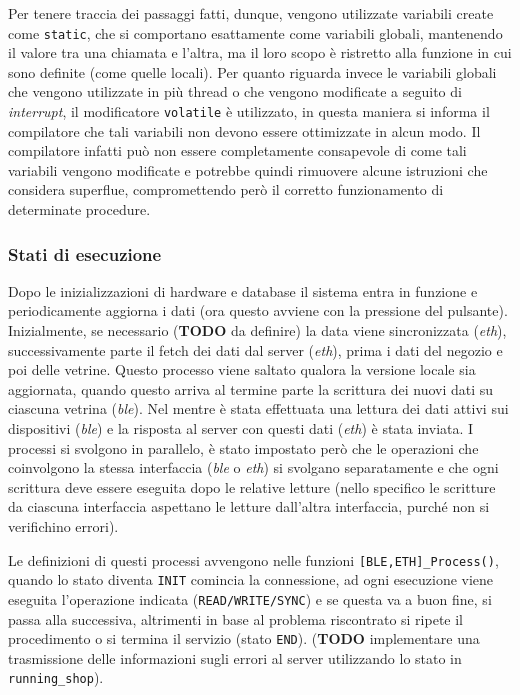 Per tenere traccia dei passaggi fatti, dunque, vengono utilizzate variabili create come \texttt{static}, che si comportano esattamente come variabili globali, mantenendo il valore tra una chiamata e l'altra, ma il loro scopo \`e ristretto alla funzione in cui sono definite (come quelle locali). Per quanto riguarda invece le variabili globali che vengono utilizzate in pi\`u thread o che vengono modificate a seguito di \textit{interrupt}, il modificatore \texttt{volatile} \`e utilizzato, in questa maniera si informa il compilatore che tali variabili non devono essere ottimizzate in alcun modo. Il compilatore infatti pu\`o non essere completamente consapevole di come tali variabili vengono modificate e potrebbe quindi rimuovere alcune istruzioni che considera superflue, compromettendo per\`o il corretto funzionamento di determinate procedure.

\subsubsection{Stati di esecuzione}


Dopo le inizializzazioni di hardware e database il sistema entra in funzione e periodicamente aggiorna i dati (ora questo avviene con la pressione del pulsante). Inizialmente, se necessario (\textbf{TODO} da definire) la data viene sincronizzata (\textit{eth}), successivamente parte il fetch dei dati dal server (\textit{eth}), prima i dati del negozio e poi delle vetrine. Questo processo viene saltato qualora la versione locale sia aggiornata, quando questo arriva al termine parte la scrittura dei nuovi dati su ciascuna vetrina (\textit{ble}). Nel mentre \`e stata effettuata una lettura dei dati attivi sui dispositivi (\textit{ble}) e la risposta al server con questi dati (\textit{eth}) \`e stata inviata. I processi si svolgono in parallelo, \`e stato impostato per\`o che le operazioni che coinvolgono la stessa interfaccia (\textit{ble} o \textit{eth}) si svolgano separatamente e che ogni scrittura deve essere eseguita dopo le relative letture (nello specifico le scritture da ciascuna interfaccia aspettano le letture dall'altra interfaccia, purch\'e non si verifichino errori).

Le definizioni di questi processi avvengono nelle funzioni \texttt{[BLE,ETH]\_Process()}, quando lo stato diventa \texttt{INIT} comincia la connessione, ad ogni esecuzione viene eseguita l'operazione indicata (\texttt{READ/WRITE/SYNC}) e se questa va a buon fine, si passa alla successiva, altrimenti in base al problema riscontrato si ripete il procedimento o si termina il servizio (stato \texttt{END}). (\textbf{TODO} implementare una trasmissione delle informazioni sugli errori al server utilizzando lo stato in \texttt{running\_shop}).

